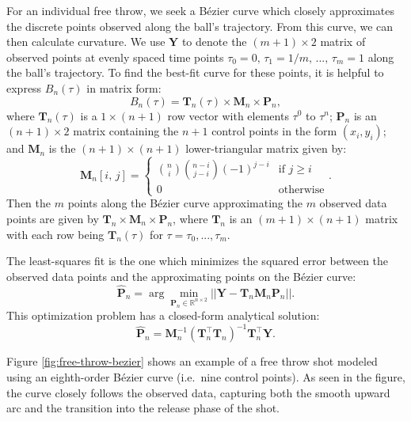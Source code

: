 \documentclass{article}
\begin{document}
            For an individual free throw, we seek a Bézier curve which closely approximates the discrete points observed along the ball's trajectory. From this curve, we can then calculate curvature. We use \(\mathbf{Y}\) to denote the \( (m + 1) \times 2\) matrix of observed points at evenly spaced time points $\tau_0 = 0,\, \tau_1 = 1 / m,\, ...,\, \tau_m = 1$ along the ball's trajectory. To find the best-fit curve for these points, it is helpful to express \(B_n(\tau)\) in matrix form:
            \[
              B_n(\tau) = \mathbf{T}_n(\tau) \times \mathbf{M}_n \times \mathbf{P}_n,
            \]
            where \( \mathbf{T}_n(\tau) \) is a \( 1 \times (n+1) \) row vector with elements \( \tau^0 \) to \( \tau^n \); \( \mathbf{P}_n \) is an \( (n+1) \times 2 \) matrix containing the \( n+1 \) control points in the form \( (x_i, y_i) \); and \( \mathbf{M}_n \) is the \( (n+1) \times (n+1) \) lower-triangular matrix given by:
            \[
              \mathbf{M}_n[i,\, j] = \begin{cases}
                  \binom{n}{i} \binom{n - i} {j - i} (-1)^{j - i} & \mbox{if } j \ge i\\
                  0 & \mbox{otherwise}
              \end{cases}.
            \]
            Then the $m$ points along the Bézier curve approximating the $m$ observed data points are given by $\mathbf{T}_n \times \mathbf{M}_n \times \mathbf{P}_n$, where \( \mathbf{T}_n \) is an \( (m + 1) \times (n+1) \) matrix with each row being \( \mathbf{T}_n(\tau) \) for $\tau = \tau_0, ..., \tau_m$.

            The least-squares fit is the one which minimizes the squared error between the observed data points and the approximating points on the Bézier curve:
            \[
              \hat{\mathbf{P}}_n = \arg\min_{\mathbf{P}_n \in \mathbb{R}^{n \times 2}} ||\mathbf{Y} - \mathbf{T}_n \mathbf{M}_n \mathbf{P}_n||.
            \]
            This optimization problem has a closed-form analytical solution:
            \[
              \hat{\mathbf{P}}_n = \mathbf{M}_n^{-1} (\mathbf{T}_n^\top \mathbf{T}_n)^{-1} \mathbf{T}_n^\top \mathbf{Y}.
            \]
            
            Figure \ref{fig:free-throw-bezier} shows an example of a free throw shot modeled using an eighth-order Bézier curve (i.e.\ nine control points). As seen in the figure, the curve closely follows the observed data, capturing both the smooth upward arc and the transition into the release phase of the shot.
\end{document}
